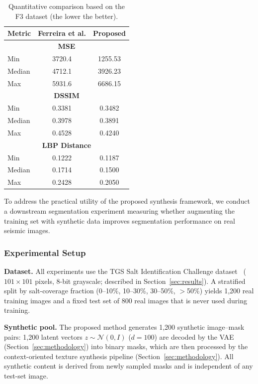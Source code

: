 \documentclass{ieeeaccess}
\begin{document}
\begin{table}[htbp]
    \centering
     \caption{Quantitative comparison based on the F3 dataset (the lower the better).}
    \label{tab:metricsSummary}
    \begin{tabular}{lcc}
        \toprule
        \textbf{Metric} & \textbf{Ferreira et al.} & \textbf{Proposed} \\
        \midrule
        \multicolumn{3}{c}{\textbf{MSE}} \\
        Min & 3720.4 & 1255.53 \\
        Median & 4712.1 & 3926.23 \\
        Max & 5931.6 & 6686.15 \\
        \midrule
        \multicolumn{3}{c}{\textbf{DSSIM}} \\
        Min & 0.3381 & 0.3482 \\
        Median & 0.3978 & 0.3891 \\
        Max & 0.4528 & 0.4240 \\
        \midrule
        \multicolumn{3}{c}{\textbf{LBP Distance}} \\
        Min & 0.1222 & 0.1187 \\
        Median & 0.1714 & 0.1500 \\
        Max & 0.2428 & 0.2050 \\
        \bottomrule
    \end{tabular}
\end{table}


\label{sec:downstream}

To address the practical utility of the proposed synthesis framework, we conduct a downstream segmentation experiment measuring whether augmenting the training set with synthetic data improves segmentation performance on real seismic images.

\subsubsection{Experimental Setup}

\noindent\textbf{Dataset.} All experiments use the TGS Salt Identification Challenge dataset~\cite{TGS2023} ($101 \times 101$ pixels, 8-bit grayscale; described in Section~\ref{sec:results}). A stratified split by salt-coverage fraction (0--10\%, 10--30\%, 30--50\%, $>$50\%) yields 1,200 real training images and a fixed test set of 800 real images that is never used during training.

\noindent\textbf{Synthetic pool.} The proposed method generates 1,200 synthetic image--mask pairs: 1,200 latent vectors $z \sim \mathcal{N}(0,I)$ ($d = 100$) are decoded by the VAE (Section~\ref{sec:methodology}) into binary masks, which are then processed by the context-oriented texture synthesis pipeline (Section~\ref{sec:methodology}). All synthetic content is derived from newly sampled masks and is independent of any test-set image.
\end{document}
